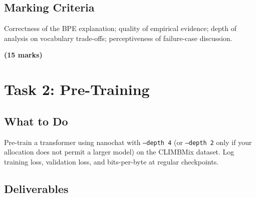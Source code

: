 \subsection{Marking Criteria}

Correctness of the BPE explanation; quality of empirical evidence; depth of analysis on vocabulary trade-offs; perceptiveness of failure-case discussion.

\noindent\textbf{(15 marks)}

\section{Task 2: Pre-Training}
\label{sec:task2}

\subsection{What to Do}

Pre-train a transformer using nanochat with \texttt{--depth~4} (or \texttt{--depth~2} only if your allocation does not permit a larger model) on the CLIMBMix dataset. Log training loss, validation loss, and bits-per-byte at regular checkpoints.

\subsection{Deliverables}

